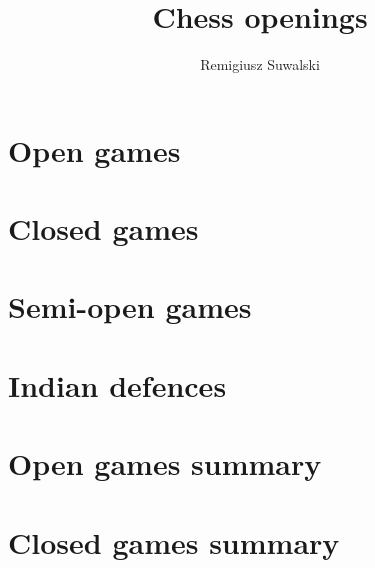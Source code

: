 \documentclass[a4paper,8pt]{extarticle}
\begin{document}
\author{Remigiusz Suwalski}
\title{Chess openings}
\section{Open games}

\section{Closed games}

\section{Semi-open games}

\section{Indian defences}

\section{Open games summary}

\section{Closed games summary}

\end{document}
